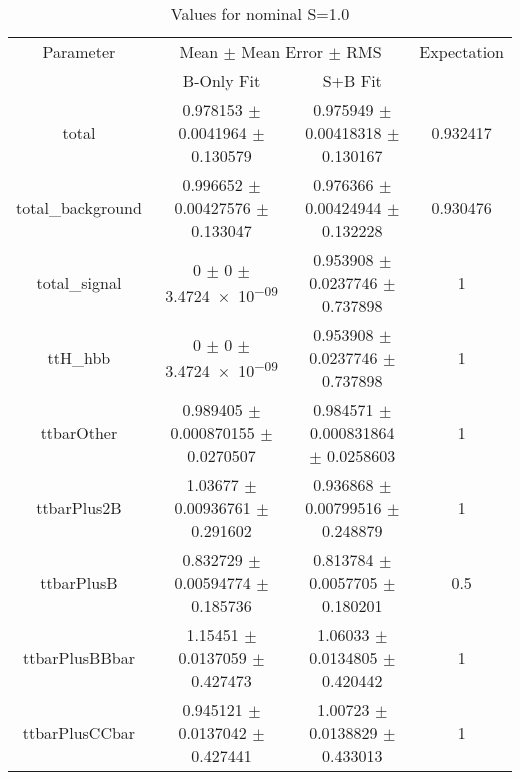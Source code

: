 \begin{table}
\centering
\caption{Values for nominal S=1.0}
\begin{tabular}{cccc}
\toprule
Parameter & \multicolumn{2}{c}{Mean $\pm$ Mean Error $\pm$ RMS} & Expectation\\
 & B-Only Fit & S+B Fit & \\
\midrule
total & \num{0.978153} $\pm$ \num{0.0041964} $\pm$ \num{0.130579} & \num{0.975949} $\pm$ \num{0.00418318} $\pm$ \num{0.130167} & \num{0.932417}\\
total\_background & \num{0.996652} $\pm$ \num{0.00427576} $\pm$ \num{0.133047} & \num{0.976366} $\pm$ \num{0.00424944} $\pm$ \num{0.132228} & \num{0.930476}\\
total\_signal & \num{0} $\pm$ \num{0} $\pm$ \num{3.4724e-09} & \num{0.953908} $\pm$ \num{0.0237746} $\pm$ \num{0.737898} & \num{1}\\
ttH\_hbb & \num{0} $\pm$ \num{0} $\pm$ \num{3.4724e-09} & \num{0.953908} $\pm$ \num{0.0237746} $\pm$ \num{0.737898} & \num{1}\\
ttbarOther & \num{0.989405} $\pm$ \num{0.000870155} $\pm$ \num{0.0270507} & \num{0.984571} $\pm$ \num{0.000831864} $\pm$ \num{0.0258603} & \num{1}\\
ttbarPlus2B & \num{1.03677} $\pm$ \num{0.00936761} $\pm$ \num{0.291602} & \num{0.936868} $\pm$ \num{0.00799516} $\pm$ \num{0.248879} & \num{1}\\
ttbarPlusB & \num{0.832729} $\pm$ \num{0.00594774} $\pm$ \num{0.185736} & \num{0.813784} $\pm$ \num{0.0057705} $\pm$ \num{0.180201} & \num{0.5}\\
ttbarPlusBBbar & \num{1.15451} $\pm$ \num{0.0137059} $\pm$ \num{0.427473} & \num{1.06033} $\pm$ \num{0.0134805} $\pm$ \num{0.420442} & \num{1}\\
ttbarPlusCCbar & \num{0.945121} $\pm$ \num{0.0137042} $\pm$ \num{0.427441} & \num{1.00723} $\pm$ \num{0.0138829} $\pm$ \num{0.433013} & \num{1}\\
\bottomrule
\end{tabular}
\end{table}